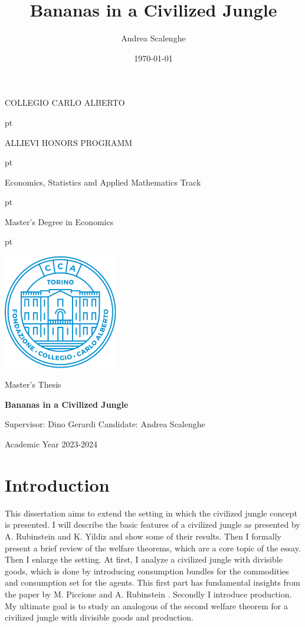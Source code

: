 \documentclass[12pt,a4paper]{article}
\title{Bananas in a Civilized Jungle}
\author{Andrea Scalenghe}
\date{\today}
\numberwithin{theorem}{section}
\numberwithin{definition}{section}
\numberwithin{example}{section}
\numberwithin{exercise}{section}
\begin{document}
\thispagestyle{empty}

\centerline {\Large{\textsc{COLLEGIO CARLO ALBERTO}}}
 pt

\centerline {\Large{\textsc ALLIEVI HONORS PROGRAMM}}

 pt

\centerline {{\textsc Economics, Statistics and Applied Mathematics Track}}

 pt

\centerline {\Large{\textsc Master's Degree in Economics}}
 pt





\centerline {\includegraphics[width=5cm]{cca.png}}

\vskip 1.2cm

\centerline {\normalsize {Master's Thesis}} 

\vskip 0.7cm

\centerline {\Large {\bf Bananas in a Civilized Jungle} }

\vskip 1.7cm

\noindent Supervisor: Dino Gerardi
\hfill  {Candidate: Andrea Scalenghe}

\vskip 2.7cm


\centerline{Academic Year 2023-2024}

\newpage
{
\hypersetup{linkcolor = black}
\tableofcontents
{}
}
\newpage

\section{Introduction}

This dissertation aims to extend the setting in which the civilized jungle concept is presented. I will describe the basic features of a civilized jungle as presented by A. Rubinstein and K. Yildiz \cite{RY} and show some of their results. Then I formally present a brief review of the welfare theorems, which are a core topic of the essay. Then I enlarge the setting. At first, I analyze a civilized jungle with divisible goods, which is done by introducing consumption bundles for the commodities and consumption set for the agents. This first part has fundamental insights from the paper by M. Piccione and A. Rubinstein \cite{P-R}. Secondly I introduce production. My ultimate goal is to study an analogous of the second welfare theorem for a civilized jungle with divisible goods and production. 
\end{document}
